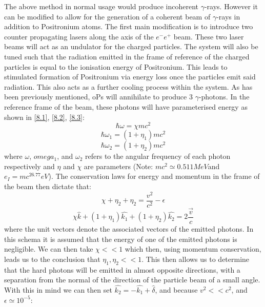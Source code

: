 \newline
\newline
The above method in normal usage would produce incoherent $\gamma$-rays. However it can be modified to allow for the generation of a coherent beam of $\gamma$-rays in addition to Positronium atoms. The first main modification is to introduce two counter propagating lasers along the axis of the $e^-e^+$ beam. These two laser beams will act as an undulator for the charged particles. The system will also be tuned such that the radiation emitted in the frame of reference of the charged particles is equal to the ionisation energy of Positronium. This leads to stimulated formation of Positronium via energy loss once the particles emit said radiation. This also acts as a further cooling process within the system.  
\newline
\newline
As has been previously mentioned, oPs will annihilate to produce 3 $\gamma$-photons. In the reference frame of the beam, these photons will have parameterised energy as shown in \ref{8.1}, \ref{8.2}, \ref{8.3}:
\begin{equation}
\label{8.1}
\hbar \omega = \chi m c^2
\end{equation}
\begin{equation}
\label{8.2}
\hbar \omega_1 = (1+ \eta_1)m c^2
\end{equation}
\begin{equation}
\label{8.3}
\hbar \omega_2 = (1+\eta_2)m c^2
\end{equation}
where $\omega$, $omega_1$, and $\omega_2$  refers to the angular frequency of each photon respectively and $\eta$ and $\chi$ are parameters (Note: $mc^2\simeq0.511 MeV$and $e_I=mc^26.77 eV$). The conservation laws for energy and momentum in the frame of the beam then dictate that:
\begin{equation}
\label{8.4}
\chi + \eta_2 +\eta_2 = \frac{v^2}{c^2} - \epsilon
\end{equation}
\begin{equation}
\label{8.5}
\chi \hat{k} + (1+\eta_1)\hat{k_1} + (1+\eta_2)\hat{k_2} = 2\frac{\vec{v}}{c}
\end{equation}
where the unit vectors denote the associated vectors of the emitted photons. In this schema it is assumed that the energy of one of the emitted photons is negligible. We can then take $\chi << 1$ which then, using momentum conservation, leads us to the conclusion that $\eta_1,\eta_2 << 1$. This then allows us to determine that the hard photons will be emitted in almost opposite directions, with a separation from the normal of the direction of the particle beam of a small angle. With this in mind we can then set $\hat{k_2}=-\hat{k_1}+\hat{\delta}$, and because $v^2 << c^2$, and $\epsilon \simeq10^{-5}$:
